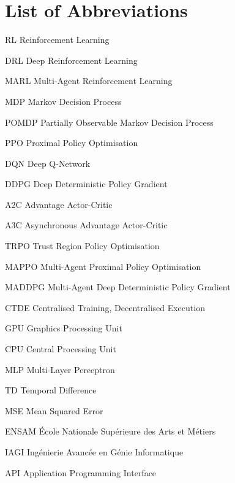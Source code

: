 \chapter*{List of Abbreviations}
\begin{abbrv}

    \item[RL]     Reinforcement Learning
    \item[DRL]    Deep Reinforcement Learning
    \item[MARL]   Multi-Agent Reinforcement Learning
    \item[MDP]    Markov Decision Process
    \item[POMDP]  Partially Observable Markov Decision Process
    \item[PPO]    Proximal Policy Optimisation
    \item[DQN]    Deep Q-Network
    \item[DDPG]   Deep Deterministic Policy Gradient
    \item[A2C]    Advantage Actor-Critic
    \item[A3C]    Asynchronous Advantage Actor-Critic
    \item[TRPO]   Trust Region Policy Optimisation
    \item[MAPPO]  Multi-Agent Proximal Policy Optimisation
    \item[MADDPG] Multi-Agent Deep Deterministic Policy Gradient
    \item[CTDE]   Centralised Training, Decentralised Execution
    \item[GPU]    Graphics Processing Unit
    \item[CPU]    Central Processing Unit
    \item[MLP]    Multi-Layer Perceptron
    \item[TD]     Temporal Difference
    \item[MSE]    Mean Squared Error
    \item[ENSAM]  École Nationale Supérieure des Arts et Métiers
    \item[IAGI]   Ingénierie Avancée en Génie Informatique
    \item[API]    Application Programming Interface

\end{abbrv}
